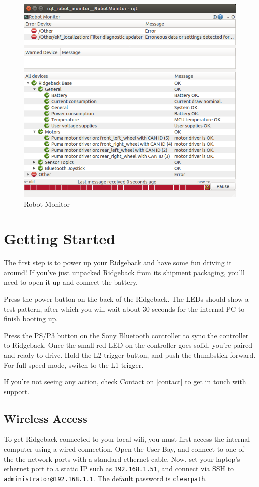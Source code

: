 \documentclass[]{clearpath-latex/clearpath-manual}
\begin{document}
\begin{figure}[!htb]
  \centering
  \includegraphics[width=0.75\linewidth]{rqt_robot_monitor.png}
  \caption{Robot Monitor}
  \label{robotmonitor}
\end{figure}



\section{Getting Started}

The first step is to power up your Ridgeback and have some fun driving it around! If you’ve just unpacked Ridgeback
from its shipment packaging, you’ll need to open it up and connect the battery.

Press the power button on the back of the Ridgeback. The LEDs should show a test pattern, after which you will
wait about 30 seconds for the internal PC to finish booting up.

Press the PS/P3 button on the Sony Bluetooth controller to sync the controller to Ridgeback. Once the small red
LED on the controller goes solid, you’re paired and ready to drive. Hold the L2 trigger button, and push the
thumbstick forward. For full speed mode, switch to the L1 trigger.

If you’re not seeing any action, check Contact on \autoref{contact} to get in touch with support.

\subsection{Wireless Access}

To get Ridgeback connected to your local wifi, you must first access the internal computer using a wired connection.
Open the User Bay, and connect to one of the the network ports with a standard
ethernet cable. Now, set your laptop’s ethernet port to a static IP such as \lstinline{192.168.1.51}, and connect via SSH
to \lstinline{administrator@192.168.1.1}. The default password is \lstinline{clearpath}.
\end{document}
